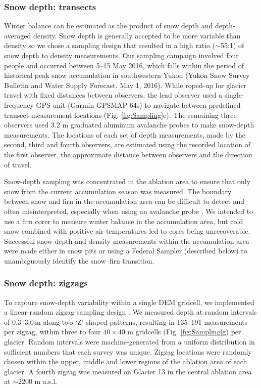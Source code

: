 \documentclass[review,oneside, letterpaper]{igs}
\begin{document}
\subsubsection{Snow depth: transects}

Winter balance can be estimated as the product of snow depth and depth-averaged density. Snow depth is generally accepted to be more variable than density \citep{Elder1991, Clark2011, Lopez2013} so we chose a sampling design that resulted in a high ratio ($\sim$55:1) of snow depth to density measurements. Our sampling campaign involved four people and occurred between 5--15 May 2016, which falls within the period of historical peak snow accumulation in southwestern Yukon (Yukon Snow Survey Bulletin and Water Supply Forecast, May 1, 2016). While roped-up for glacier travel with fixed distances between observers, the lead observer used a single-frequency GPS unit (Garmin GPSMAP 64s) to navigate between predefined transect measurement locations (Fig. \ref{fig:Sampling}e). The remaining three observers used 3.2 m graduated aluminum avalanche probes to make snow-depth measurements. The locations of each set of depth measurements, made by the second, third and fourth observers, are estimated using the recorded location of the first observer, the approximate distance between observers and the direction of travel. 

Snow-depth sampling was concentrated in the ablation area to ensure that only snow from the current accumulation season was measured. The boundary between snow and firn in the accumulation area can be difficult to detect and often misinterpreted, especially when using an avalanche probe \citep{Grunewald2010,Sold2013}. We intended to use a firn corer to measure winter balance in the accumulation area, but cold snow combined with positive air temperatures led to cores being unrecoverable. Successful snow depth and density measurements within the accumulation area were made either in snow pits or using a Federal Sampler (described below) to unambiguously identify the snow--firn transition. 

\subsubsection{Snow depth: zigzags}

To capture snow-depth variability within a single DEM gridcell, we implemented a linear-random zigzag sampling design \citep{Shea2010}. We measured depth at random intervals of 0.3--3.0\,m along two `Z'-shaped patterns, resulting in 135--191 measurements per zigzag, within three to four $40\times40$ m gridcells (Fig. \ref{fig:Sampling}g) per glacier. Random intervals were machine-generated from a uniform distribution in sufficient numbers that each survey was unique. Zigzag locations were randomly chosen within the upper, middle and lower regions of the ablation area of each glacier. A fourth zigzag was measured on Glacier 13 in the central ablation area at $\sim$2200 m a.s.l.
\end{document}
